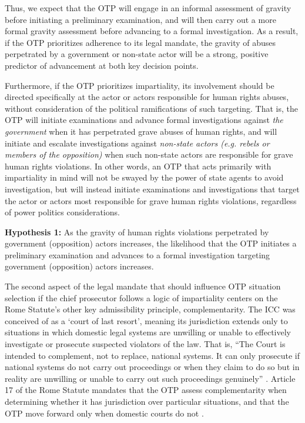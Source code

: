 Thus, we expect that the OTP will engage in an informal assessment of gravity before initiating a preliminary examination, and will then carry out a more formal gravity assessment before advancing to a formal investigation. As a result, if the OTP prioritizes adherence to its legal mandate, the gravity of abuses perpetrated by a government or non-state actor will be a strong, positive predictor of advancement at both key decision points.

Furthermore, if the OTP prioritizes impartiality, its involvement should be directed specifically at the actor or actors responsible for human rights abuses, without consideration of the political ramifications of such targeting. That is, the OTP will initiate examinations and advance formal investigations against \emph{the government} when it has perpetrated grave abuses of human rights, and will initiate and escalate investigations against \emph{non-state actors (e.g. rebels or members of the opposition)} when such non-state actors are responsible for grave human rights violations. In other words, an OTP that acts primarily with impartiality in mind will not be swayed by the power of state agents to avoid investigation, but will instead initiate examinations and investigations that target the actor or actors most responsible for grave human rights violations, regardless of power politics considerations.

\textbf{Hypothesis 1:} As the gravity of human rights violations perpetrated by government (opposition) actors increases, the likelihood that the OTP initiates a preliminary examination and advances to a formal investigation targeting government (opposition) actors increases.

The second aspect of the legal mandate that should influence OTP situation selection if the chief prosecutor follows a logic of impartiality centers on the Rome Statute's other key admissibility principle, complementarity. The ICC was conceived of as a `court of last resort', meaning its jurisdiction extends only to situations in which domestic legal systems are unwilling or unable to effectively investigate or prosecute suspected violators of the law. That is, ``The Court is intended to complement, not to replace, national systems. It can only prosecute if national systems do not carry out proceedings or when they claim to do so but in reality are unwilling or unable to carry out such proceedings genuinely'' \citep{bensouda12}. Article 17 of the Rome Statute mandates that the OTP assess complementarity when determining whether it has jurisdiction over particular situations, and that the OTP move forward only when domestic courts do not \citep{schabas2011introduction}.


